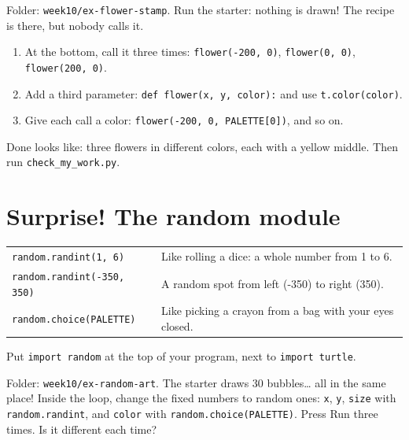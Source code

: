 \begin{exercise}
Folder: \texttt{week10/ex-flower-stamp}. Run the starter: nothing is drawn! The recipe is there, but nobody calls it.
\begin{enumerate}[leftmargin=1.4em,itemsep=1pt]
  \item At the bottom, call it three times: \texttt{flower(-200, 0)}, \texttt{flower(0, 0)}, \texttt{flower(200, 0)}.
  \item Add a third parameter: \texttt{def flower(x, y, color):} and use \texttt{t.color(color)}.
  \item Give each call a color: \texttt{flower(-200, 0, PALETTE[0])}, and so on.
\end{enumerate}
Done looks like: three flowers in different colors, each with a yellow middle. Then run \texttt{check\_my\_work.py}.
\end{exercise}

\section{Surprise! The random module}
\begin{center}
\renewcommand{\arraystretch}{1.5}
\begin{tabularx}{\linewidth}{@{}p{6.9cm}>{\raggedright\arraybackslash}X@{}}
\toprule
\texttt{random.randint(1, 6)} & Like rolling a dice: a whole number from 1 to 6.\\
\texttt{random.randint(-350, 350)} & A random spot from left (-350) to right (350).\\
\texttt{random.choice(PALETTE)} & Like picking a crayon from a bag with your eyes closed.\\
\bottomrule
\end{tabularx}
\end{center}
Put \texttt{import random} at the top of your program, next to \texttt{import turtle}.

\begin{exercise}
Folder: \texttt{week10/ex-random-art}. The starter draws 30 bubbles\ldots{} all in the same place! Inside the loop, change the fixed numbers to random ones: \texttt{x}, \texttt{y}, \texttt{size} with \texttt{random.randint}, and \texttt{color} with \texttt{random.choice(PALETTE)}. Press Run three times. Is it different each time?
\end{exercise}

